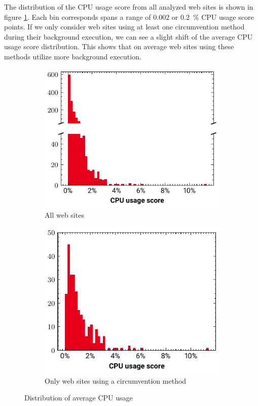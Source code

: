 \documentclass[
	ruledheaders=section,%
	class=report,%
	thesis={type=bachelor},%
	accentcolor=9c,%
	custommargins=true,%
	marginpar=false,%
	parskip=half-,%
	fontsize=11pt,%
]{tudapub}
\begin{document}
  The distribution of the CPU usage score from all analyzed web sites is shown in figure \ref{fig:distribution-cpu-usage}. Each bin corresponds spans a range of 0.002 or 0.2~\% CPU usage score points. If we only consider web sites using at least one circumvention method during their background execution, we can see a slight shift of the average CPU usage score distribution. This shows that on average web sites using these methods utilize more background execution. 


  \begin{figure}
    \begin{subfigure}[t]{0.5\textwidth}
      \includegraphics[width=\textwidth]{images/histogram-global.pdf}
      \caption{All web sites}
    \end{subfigure}
    \hfill
    \begin{subfigure}[t]{0.5\textwidth}
      \includegraphics[width=\textwidth]{images/histogram-method.pdf}
      \caption{Only web sites using a circumvention method}
    \end{subfigure}

    \caption{Distribution of average CPU usage}
    \label{fig:distribution-cpu-usage}
  \end{figure}
  
\end{document}
